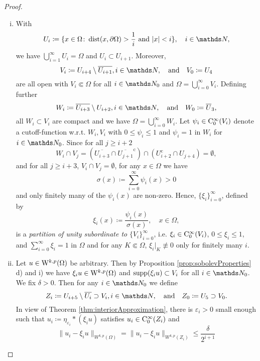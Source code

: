 \begin{proof}
  \begin{enumerate}[i)]
  \item With
    $$
    U_i \coloneqq \{ x \in \Omega \colon \dist(x, \partial \Omega) > \frac{1}{i} \text{ and } |x| < i\}, \quad i \in \N,
    $$
    we have $\bigcup_{i = 1}^\infty U_i = \Omega$ and $U_i \subset U_{i + 1}$.
    Moreover, 
    $$V_i \coloneqq U_{i + 4} \setminus \overline{U_{i + 1}}, i \in \N,\quad\text{and}\quad V_0\coloneqq U_4$$
    are all open with $V_i \Subset \Omega$ for all $i \in \N_0$ and  $\Omega = \bigcup_{i = 0}^\infty V_i$.
    Defining further 
    $$
    W_i \coloneqq \overline{U_{i + 3}} \setminus U_{i + 2}, i \in \N, \quad\text{and}\quad W_0 \coloneqq \overline U_3,
    $$
    all $W_i \subset V_i$ are compact and we have $\Omega = \bigcup_{i = 0}^\infty W_i$.
      Let $\psi_i \in \mathrm{C}_0^\infty(V_i)$ denote a cutoff\hyp{}function w.r.t. $W_i, V_i$ with $0 \leq \psi_i \leq 1$ and $\psi_i = 1$ in $W_i$ for $i \in \N_0$.
    Since for all $j \geq i + 2$
    $$W_i \cap V_j 
    = \left(\overline{U_{i + 3}} \cap \overline{U_{j + 1}}^{\mathrm c}  \right)\cap \left( U_{i + 2}^{\mathrm c} \cap  U_{j + 4}   \right) 
    =  \emptyset,$$ 
    and for all $j \geq i + 3$, $V_i \cap V_j = \emptyset$, for any $x \in \Omega$ we have
    $$
    \sigma(x) \coloneqq \sum_{i = 0}^\infty \psi_i(x) > 0
    $$
    and only finitely many of the $\psi_i(x)$ are non-zero.
    Hence, $\{\xi_i\}_{i = 0}^\infty$, defined by
    $$\xi_i(x) \coloneqq \frac{\psi_i(x)}{\sigma(x)}, \quad x \in \Omega,$$
      is a \emph{partition of unity subordinate to} $\{V_i\}_{i = 0}^\infty$, i.e. $\xi_i \in \mathrm{C}_0^\infty(V_i)$, $0 \leq \xi_i \leq 1$, and $\sum_{i = 0}^\infty \xi_i = 1$ in $\Omega$ and for any $K \Subset \Omega$, $\xi_i|_K \not\equiv 0$ only for finitely many $i$.
  \item Let $u \in \mathrm{W}^{k,p}(\Omega)$ be arbitrary.
    Then by Proposition \ref{prop:sobolevProperties} d) and i) we have $\xi_i u \in \mathrm{W}^{k,p}(\Omega)$ and $\operatorname{supp}(\xi_i u) \subset V_i$ for all $i \in \N_0$.
    We fix $\delta > 0$.
    Then for any $i \in \N_0$ we define
    $$
    Z_i \coloneqq U_{i + 5} \setminus \overline{U_i} \supset V_i, i \in \N, \quad\text{and}\quad Z_0 \coloneqq U_5 \supset V_0.
    $$
    In view of Theorem \ref{thm:interiorApproximation}, there is $\varepsilon_i > 0$ small enough such that $u_i \coloneqq \eta_{\varepsilon_i} \ast (\xi_i u)$ satisfies $u_i \in \mathrm{C}_0^\infty(Z_i)$ and
    \begin{equation}
      \|u_i - \xi_i u \|_{W^{k,p}(\Omega)} = \|u_i - \xi_i u\|_{W^{k,p}(Z_i)} \leq \frac{\delta}{2^{i + 1}}

\end{equation}
\end{enumerate}
\end{proof}
